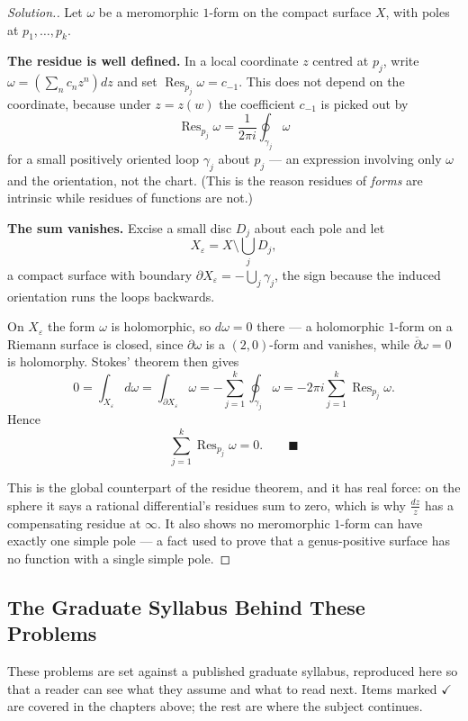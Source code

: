 \documentclass[11pt,a4paper]{article}
\theoremstyle{definition}
\newenvironment{solution}
  {\renewcommand{\qedsymbol}{}\begin{proof}[\textit{Solution}.]}
  {\end{proof}}
\begin{document}
\begin{solution}
Let $\omega$ be a meromorphic $1$-form on the compact surface $X$, with poles at
$p_1,\ldots,p_k$.

\textbf{The residue is well defined.} In a local coordinate $z$ centred at $p_j$,
write $\omega = \left(\sum_{n} c_n z^{n}\right)dz$ and set
$\operatorname{Res}_{p_j}\omega = c_{-1}$. This does not depend on the coordinate,
because under $z = z(w)$ the coefficient $c_{-1}$ is picked out by
$$\operatorname{Res}_{p_j}\omega = \frac{1}{2\pi i}\oint_{\gamma_j}\omega$$
for a small positively oriented loop $\gamma_j$ about $p_j$ --- an expression
involving only $\omega$ and the orientation, not the chart. (This is the reason
residues of \emph{forms} are intrinsic while residues of functions are not.)

\textbf{The sum vanishes.} Excise a small disc $D_j$ about each pole and let
$$X_\varepsilon = X \setminus \bigcup_{j} D_j ,$$
a compact surface with boundary $\partial X_\varepsilon = -\bigcup_j \gamma_j$, the
sign because the induced orientation runs the loops backwards.

On $X_\varepsilon$ the form $\omega$ is holomorphic, so $d\omega = 0$ there --- a
holomorphic $1$-form on a Riemann surface is closed, since $\partial\omega$ is a
$(2,0)$-form and vanishes, while $\overline{\partial}\omega = 0$ is holomorphy.
Stokes' theorem then gives
$$0 = \int_{X_\varepsilon} d\omega = \int_{\partial X_\varepsilon}\omega
= -\sum^{k}_{j=1}\oint_{\gamma_j}\omega
= -2\pi i \sum^{k}_{j=1}\operatorname{Res}_{p_j}\omega .$$
Hence
$$\boxed{\sum^{k}_{j=1}\operatorname{Res}_{p_j}\omega = 0 .} \qquad \blacksquare$$

This is the global counterpart of the residue theorem, and it has real force: on the
sphere it says a rational differential's residues sum to zero, which is why
$\frac{dz}{z}$ has a compensating residue at $\infty$. It also shows no meromorphic
$1$-form can have exactly one simple pole --- a fact used to prove that a
genus-positive surface has no function with a single simple pole.
\end{solution}


{\color[wave]{485}\subsection{The Graduate Syllabus Behind These Problems}}

These problems are set against a published graduate syllabus, reproduced here so
that a reader can see what they assume and what to read next. Items marked
$\checkmark$ are covered in the chapters above; the rest are where the subject
continues.
\end{document}
